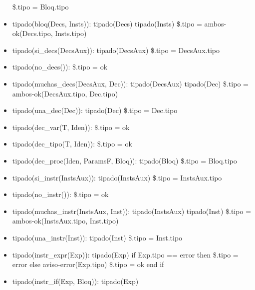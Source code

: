 \documentclass[11pt]{article}
\begin{document}
\begin{itemize}
                \subitem \$.tipo = Bloq.tipo
            \item tipado(bloq(Decs, Insts)): 
                \subitem tipado(Decs)
                \subitem tipado(Insts)
                \subitem \$.tipo = ambos-ok(Decs.tipo, Insts.tipo)
            \item tipado(si\_decs(DecsAux)): 
                \subitem tipado(DecsAux)
                \subitem \$.tipo = DecsAux.tipo
            \item tipado(no\_decs()): 
                \subitem \$.tipo = ok
            \item tipado(muchas\_decs(DecsAux, Dec)): 
                \subitem tipado(DecsAux)
                \subitem tipado(Dec)
                \subitem \$.tipo = ambos-ok(DecsAux.tipo, Dec.tipo)
            \item tipado(una\_dec(Dec)): 
                \subitem tipado(Dec)
                \subitem \$.tipo = Dec.tipo
            \item tipado(dec\_var(T, Iden)): 
                \subitem \$.tipo = ok
            \item tipado(dec\_tipo(T, Iden)): 
                \subitem \$.tipo = ok
            \item tipado(dec\_proc(Iden, ParamsF, Bloq)): 
                \subitem tipado(Bloq)
                \subitem \$.tipo = Bloq.tipo
            \item tipado(si\_instr(InstsAux)): 
                \subitem tipado(InstsAux)
                \subitem \$.tipo = InstsAux.tipo
            \item tipado(no\_instr()): 
                \subitem \$.tipo = ok
            \item tipado(muchas\_instr(InstsAux, Inst)): 
                \subitem tipado(InstsAux)
                \subitem tipado(Inst)
                \subitem \$.tipo = ambos-ok(InstsAux.tipo, Inst.tipo)
            \item tipado(una\_instr(Inst)): 
                \subitem tipado(Inst)
                \subitem \$.tipo = Inst.tipo
            \item tipado(instr\_expr(Exp)): 
                \subitem tipado(Exp)
                \subitem if Exp.tipo == error then
                    \subsubitem \$.tipo = error
                \subitem else
                    \subsubitem aviso-error(Exp.tipo)
                    \subsubitem \$.tipo = ok
                \subitem end if
            \item tipado(instr\_if(Exp, Bloq)): 
                \subitem tipado(Exp)

\end{itemize}
\end{document}
